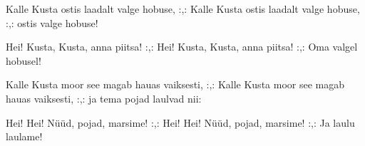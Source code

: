 Kalle Kusta ostis laadalt valge hobuse,
:,: Kalle Kusta ostis laadalt valge hobuse, :,:
ostis valge hobuse!

Hei! Kusta, Kusta, anna piitsa!
:,: Hei! Kusta, Kusta, anna piitsa! :,:
Oma valgel hobusel!

Kalle Kusta moor see magab hauas vaiksesti,
:,: Kalle Kusta moor see magab hauas vaiksesti, :,:
ja tema pojad laulvad nii:

Hei! Hei! N\"u\"ud, pojad, marsime!
:,: Hei! Hei! N\"u\"ud, pojad, marsime! :,:
Ja laulu laulame!
